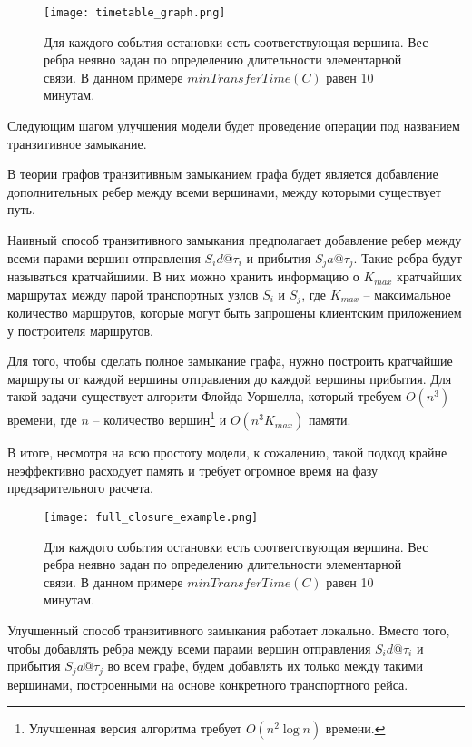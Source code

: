 \begin{figure}[!h]
	\centering
	\texttt{[image: timetable\_graph.png]}
	\caption{Для каждого события остановки есть соответствующая вершина. Вес ребра неявно задан по определению длительности элементарной связи. В данном примере $minTransferTime(C)$ равен 10 минутам.}\label{fig4}
\end{figure}

Следующим шагом улучшения модели будет проведение операции под названием транзитивное замыкание.

\begin{definition}
	В теории графов транзитивным замыканием графа будет является добавление дополнительных ребер между всеми вершинами, между которыми существует путь.
\end{definition}

Наивный способ транзитивного замыкания предполагает добавление ребер между всеми парами вершин отправления $S_id@\tau_i$ и прибытия $S_ja@\tau_j$. Такие ребра будут называться кратчайшими. В них можно хранить информацию о $K_{max}$ кратчайших маршрутах между парой транспортных узлов $S_i$ и $S_j$, где $K_{max}$ -- максимальное количество маршрутов, которые могут быть запрошены клиентским приложением у построителя маршрутов. 

Для того, чтобы сделать полное замыкание графа, нужно построить кратчайшие маршруты от каждой вершины отправления до каждой вершины прибытия. Для такой задачи существует алгоритм Флойда-Уоршелла, который требуем $O(n^3)$ времени, где $n$ -- количество вершин\footnote{Улучшенная версия алгоритма требует $O(n^2\log n)$ времени.} и $O(n^3K_{max})$ памяти.

В итоге, несмотря на всю простоту модели, к сожалению, такой подход крайне неэффективно расходует память и требует огромное время на фазу предварительного расчета. 

\begin{figure}[!h]
	\centering
	\texttt{[image: full\_closure\_example.png]}
	\caption{Для каждого события остановки есть соответствующая вершина. Вес ребра неявно задан по определению длительности элементарной связи. В данном примере $minTransferTime(C)$ равен 10 минутам.}\label{fig4}
\end{figure}

Улучшенный способ транзитивного замыкания работает локально. Вместо того, чтобы добавлять ребра между всеми парами вершин отправления $S_id@\tau_i$ и прибытия $S_ja@\tau_j$ во всем графе, будем добавлять их только между такими вершинами, построенными на основе конкретного транспортного рейса.

